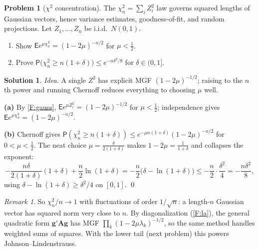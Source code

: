 \documentclass[14pt]{extarticle}
\theoremstyle{definition}
\newtheorem{exercise}{Problem}
\newtheorem*{solution}{Solution}
\theoremstyle{remark}
\newtheorem*{remark}{Remark}
\newcommand\expc{\mathsf{E}}
\newcommand\prb{\mathsf{P}}
\newcommand{\bA}{\mathbf{A}}
\newcommand{\bg}{\mathbf{g}}
\begin{document}
\begin{exercise}[$\chi^2$ concentration]\label{prob:chisq}
The $\chi^2_n=\sum_iZ_i^2$ law governs squared lengths of Gaussian vectors, hence variance estimates, goodness-of-fit, and random projections. Let $Z_1,\ldots,Z_n$ be i.i.d.\ $N(0,1)$.
\begin{enumerate}[label=(\alph*)]
\item Show $\expc e^{\mu\chi^2_n}=(1-2\mu)^{-n/2}$ for $\mu<\tfrac12$.
\item Prove $\prb\bigl(\chi^2_n\ge n(1+\delta)\bigr)\le e^{-n\delta^2/8}$ for $\delta\in(0,1]$.
\end{enumerate}
\end{exercise}
\begin{solution}
\emph{Idea.} A single $Z^2$ has explicit MGF $(1-2\mu)^{-1/2}$; raising to the $n$th power and running Chernoff reduces everything to choosing $\mu$ well.

\textbf{(a)} By \ref{F:gauss}, $\expc e^{\mu Z_i^2}=(1-2\mu)^{-1/2}$ for $\mu<\tfrac12$; independence gives $\expc e^{\mu\chi^2_n}=(1-2\mu)^{-n/2}$.

\textbf{(b)} Chernoff gives $\prb(\chi^2_n\ge n(1+\delta))\le e^{-\mu n(1+\delta)}(1-2\mu)^{-n/2}$ for $0<\mu<\tfrac12$. The neat choice $\mu=\tfrac{\delta}{2(1+\delta)}$ makes $1-2\mu=\tfrac1{1+\delta}$ and collapses the exponent:
\[
-\frac{n\delta}{2(1+\delta)}(1+\delta)+\frac n2\ln(1+\delta)=-\frac n2\big(\delta-\ln(1+\delta)\big)\le-\frac n2\cdot\frac{\delta^2}4=-\frac{n\delta^2}8,
\]
using $\delta-\ln(1+\delta)\ge\delta^2/4$ on $[0,1]$. \qed
\end{solution}
\begin{remark}
So $\chi^2_n/n\to1$ with fluctuations of order $1/\sqrt n$: a length-$n$ Gaussian vector has squared norm very close to $n$. By diagonalization (\ref{F:la}), the general quadratic form $\bg'\bA\bg$ has MGF $\prod_k(1-2\mu\lambda_k)^{-1/2}$, so the same method handles weighted sums of squares. With the lower tail (next problem) this powers Johnson--Lindenstrauss.
\end{remark}
\end{document}

